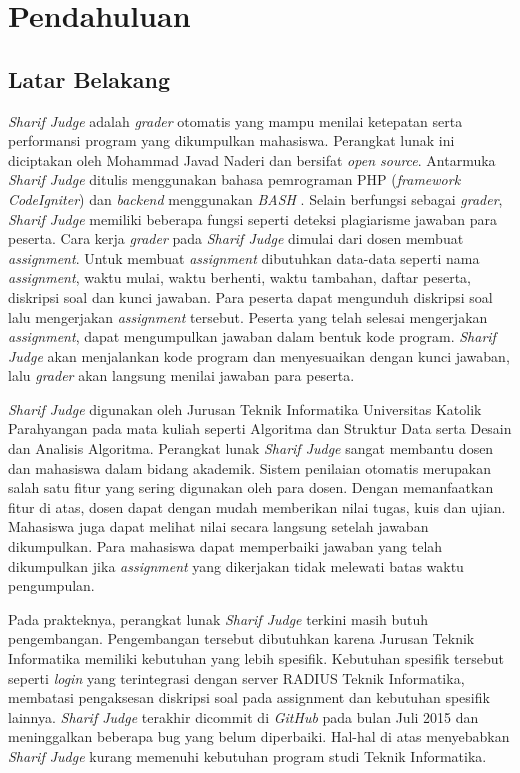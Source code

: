 \chapter{Pendahuluan}
\label{chap:intro}
   
\section{Latar Belakang}
\label{sec:label}
\textit{Sharif Judge} adalah \textit{grader} otomatis yang mampu menilai ketepatan serta performansi program yang dikumpulkan mahasiswa. Perangkat lunak ini diciptakan oleh Mohammad Javad Naderi dan bersifat \textit{open source}. Antarmuka \textit{Sharif Judge} ditulis menggunakan bahasa pemrograman PHP (\textit{framework CodeIgniter}) dan \textit{backend} menggunakan \textit{BASH} \cite{mjnaderi:14:sharifjudge}. Selain berfungsi sebagai \textit{grader}, \textit{Sharif Judge} memiliki beberapa fungsi seperti deteksi plagiarisme jawaban para peserta. Cara kerja \textit{grader} pada \textit{Sharif Judge} dimulai dari dosen membuat \textit{assignment}. Untuk membuat \textit{assignment} dibutuhkan data-data seperti nama \textit{assignment}, waktu mulai, waktu berhenti, waktu tambahan, daftar peserta, diskripsi soal dan kunci jawaban. Para peserta dapat mengunduh diskripsi soal lalu mengerjakan \textit{assignment} tersebut. Peserta yang telah selesai mengerjakan \textit{assignment}, dapat mengumpulkan jawaban dalam bentuk kode program. \textit{Sharif Judge} akan menjalankan kode program dan menyesuaikan dengan kunci jawaban, lalu \textit{grader} akan langsung menilai jawaban para peserta.

\textit{Sharif Judge} digunakan oleh Jurusan Teknik Informatika Universitas Katolik Parahyangan pada mata kuliah seperti Algoritma dan Struktur Data serta Desain dan Analisis Algoritma. Perangkat lunak \textit{Sharif Judge} sangat membantu dosen dan mahasiswa dalam bidang akademik. Sistem penilaian otomatis merupakan salah satu fitur yang sering digunakan oleh para dosen. Dengan memanfaatkan fitur di atas, dosen dapat dengan mudah memberikan nilai tugas, kuis dan ujian. Mahasiswa juga dapat melihat nilai secara langsung setelah jawaban dikumpulkan. Para mahasiswa dapat memperbaiki jawaban yang telah dikumpulkan jika \textit{assignment} yang dikerjakan tidak melewati batas waktu pengumpulan.

Pada prakteknya, perangkat lunak \textit{Sharif Judge} terkini masih butuh pengembangan. Pengembangan tersebut dibutuhkan karena Jurusan Teknik Informatika memiliki kebutuhan yang lebih spesifik. Kebutuhan spesifik tersebut seperti \textit{login} yang terintegrasi dengan server RADIUS Teknik Informatika, membatasi pengaksesan diskripsi soal pada assignment dan kebutuhan spesifik lainnya. \textit{Sharif Judge} terakhir dicommit di \textit{GitHub} pada bulan Juli 2015 dan meninggalkan beberapa bug yang belum diperbaiki. Hal-hal di atas menyebabkan \textit{Sharif Judge} kurang memenuhi kebutuhan program studi Teknik Informatika. 

